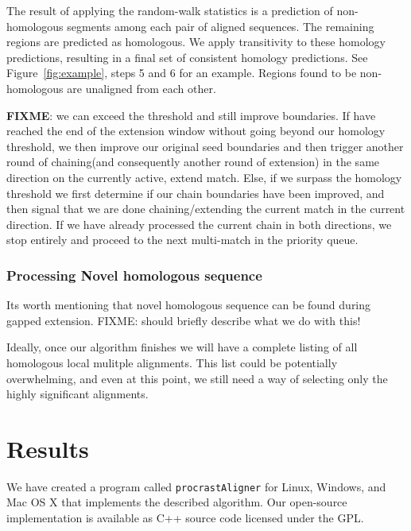 \documentclass{llncs}
\begin{document}
The result of applying the random-walk statistics is a prediction of non-homologous segments among each pair of aligned sequences.  The remaining regions are predicted as homologous.  We apply transitivity to these homology predictions, resulting in a final set of consistent homology predictions.  See Figure~\ref{fig:example}, steps 5 and 6 for an example. Regions found to be non-homologous are unaligned from each other.


\textbf{FIXME}: we can exceed the threshold and still improve boundaries.  If have reached the end of the extension window without going beyond our homology threshold, we then improve our original seed boundaries and then trigger another round of chaining(and consequently another round of extension) in the same direction on the currently active, extend match. Else, if we surpass the homology threshold we first determine if our chain boundaries have been improved, and then signal that we are done chaining/extending the current match in the current direction. If we have already processed the current chain in both directions, we stop entirely and proceed to the next multi-match in the priority queue.

\subsubsection{Processing Novel homologous sequence}
Its worth mentioning that novel homologous sequence can be found during gapped extension.
FIXME: should briefly describe what we do with this!


Ideally, once our algorithm finishes we will have a complete listing of all homologous local mulitple alignments. This list could be potentially overwhelming, and even at this point, we still need a way of selecting only the highly significant alignments.


\section{Results}
We have created a program called \texttt{procrastAligner} for Linux,
Windows, and Mac OS X that implements the described algorithm. Our
open-source implementation is available as C++ source code licensed
under the GPL.
\end{document}
